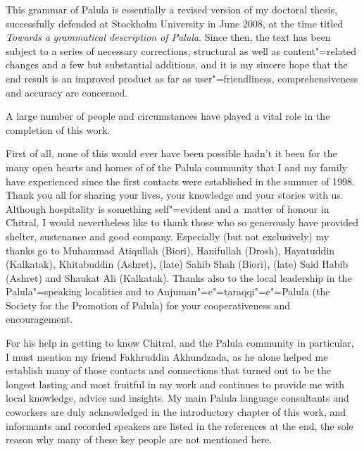 \begin{refsection}

This grammar of Palula is essentially a revised version of my doctoral thesis, successfully defended at Stockholm University in June 2008, at the time titled \textit{Towards a grammatical description of Palula}. Since then, the text has been subject to a series of necessary corrections, structural as well as content"=related changes and a few but substantial additions, and it is my sincere hope that the end result is an improved product as far as user"=friendliness, comprehensiveness and accuracy are concerned.


A large number of people and circumstances have played a vital role in the completion of this work.


First of all, none of this would ever have been possible hadn’t it been for the many open hearts and homes of of the Palula community that I and my family have experienced since the first contacts were established in the summer of 1998. Thank you all for sharing your lives, your knowledge and your stories with us. Although hospitality is something self"=evident and a~matter of honour in Chitral, I would nevertheless like to thank those who so generously have provided shelter, sustenance and good company. Especially (but not exclusively) my thanks go to Muhammad Atiqullah (Biori), Hanifullah (Drosh), Hayatuddin (Kalkatak), Khitabuddin (Ashret), (late) Sahib Shah (Biori), (late) Said Habib (Ashret) and Shaukat Ali (Kalkatak). Thanks also to the local leadership in the Palula"=speaking localities and to Anjuman"=e"=taraqqi"=e"=Palula (the Society for the Promotion of Palula) for your cooperativeness and encouragement. 


For his help in getting to know Chitral, and the Palula community in particular, I must mention my friend Fakhruddin Akhundzada, as he alone helped me establish many of those contacts and connections that turned out to be the longest lasting and most fruitful in my work and continues to provide me with local knowledge, advice and insights. My main Palula language consultants and coworkers are duly acknowledged in the introductory chapter of this work, and informants and recorded speakers are listed in the references at the end, the sole reason why many of these key people are not mentioned here.



\end{refsection}
